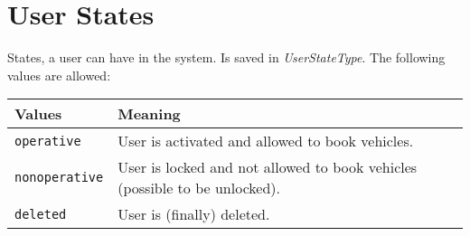 \section{User States}
\label{sec:CodeTabellen:UserStateType}

States, a user can have in the system. Is saved in \emph{UserStateType}. The following values are allowed:

\begin{flushleft}
\begin{tabularx}{\linewidth}{l>{\raggedright\arraybackslash}X}
\toprule
Values & Meaning\\
\midrule
\verb|operative| & User is activated and allowed to book vehicles.\\
\verb|nonoperative| & User is locked and not allowed to book vehicles (possible to be unlocked).\\
\verb|deleted| & User is (finally) deleted.\\
\bottomrule
\end{tabularx}
\end{flushleft}


